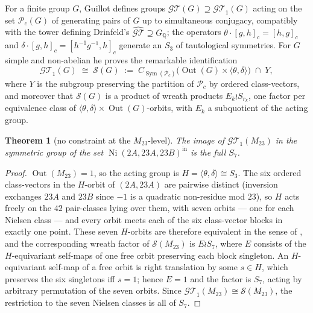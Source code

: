 \documentclass[11pt]{amsart}
\newcommand{\QQ}{\mathbb{Q}}
\newcommand{\Ni}{\operatorname{Ni}}
\newcommand{\Mtw}{M_{23}}
\theoremstyle{plain}
\newtheorem{theorem}{Theorem}[section]
\theoremstyle{definition}
\begin{document}
For a finite group $G$, Guillot \cite{Guillot} defines groups
$\mathcal{GT}(G)\supseteq\mathcal{GT}_1(G)$ acting on the set
$\mathscr{P}_c(G)$ of generating pairs of $G$ up to simultaneous
conjugacy, compatibly with the tower defining Drinfeld's
$\widehat{\mathcal{GT}}\supseteq G_\QQ$; the operators
$\theta\cdot[g,h]_c=[h,g]_c$ and
$\delta\cdot[g,h]_c=[h^{-1}g^{-1},h]_c$ generate an
$S_3$ of tautological symmetries. For $G$ simple and non-abelian he
proves the remarkable identification
\[
  \mathcal{GT}_1(G)\;\cong\;\mathscr{S}(G)
  \;:=\;C_{\operatorname{Sym}(\mathscr{P}_c)}\!\bigl(\operatorname{Out}(G)
  \times\langle\theta,\delta\rangle\bigr)\;\cap\;Y,
\]
where $Y$ is the subgroup preserving the partition of
$\mathscr{P}_c$ by ordered class-vectors, and moreover
\cite[Prop.~4.12]{Guillot} that $\mathscr{S}(G)$ is a product of
wreath products $E_k\wr S_{r_k}$, one factor per equivalence class of
$\langle\theta,\delta\rangle\times\operatorname{Out}(G)$-orbits, with
$E_k$ a subquotient of the acting group.

\begin{theorem}[no constraint at the $\Mtw$-level]\label{thm:gt}
The image of $\mathcal{GT}_1(\Mtw)$ in the symmetric group of the
set $\Ni(2A,23A,23B)^{\mathrm{in}}$ is the full $S_7$.
\end{theorem}

\begin{proof}
$\operatorname{Out}(\Mtw)=1$, so the acting group is
$H=\langle\theta,\delta\rangle\cong S_3$. The six ordered
class-vectors in the $H$-orbit of $(2A,23A)$ are pairwise distinct
(inversion exchanges $23A$ and $23B$ since $-1$ is a quadratic
non-residue mod $23$), so $H$ acts freely on the $42$ pair-classes
lying over them, with seven orbits --- one for each Nielsen class ---
and every orbit meets each of the six class-vector blocks in exactly
one point. These seven $H$-orbits are therefore equivalent in the
sense of \cite[Prop.~4.12]{Guillot}, and the corresponding wreath
factor of $\mathscr{S}(\Mtw)$ is $E\wr S_7$, where $E$ consists of
the $H$-equivariant self-maps of one free orbit preserving each block
singleton. An $H$-equivariant self-map of a free orbit is right
translation by some $s\in H$, which preserves the six singletons iff
$s=1$; hence $E=1$ and the factor is $S_7$, acting by arbitrary
permutation of the seven orbits. Since
$\mathcal{GT}_1(\Mtw)\cong\mathscr{S}(\Mtw)$, the restriction to the
seven Nielsen classes is all of $S_7$.
\end{proof}
\end{document}
